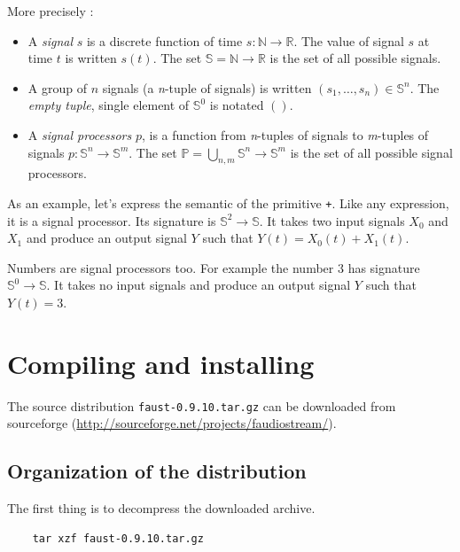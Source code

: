 \documentclass[a4paper]{book}
\begin{document}
More precisely :

\begin{itemize}

\item A \emph{signal} $s$ is a discrete function of time $s:\mathbb{N}\rightarrow\mathbb{R}$. 
The value of signal $s$ at time $t$ is written $s(t)$. 
The set $\mathbb{S}=\mathbb{N}\rightarrow\mathbb{R}$ is the set of all possible  signals.

\item A group of $n$ signals (a \emph{n}-tuple of signals) is written
$(s_{1},\ldots,s_{n})\in \mathbb{S}^{n}$.
The \emph{empty tuple}, single element of $\mathbb{S}^{0}$ is notated  $()$.

\item A \emph{signal processors} $p$, is a function from
\emph{n}-tuples of signals to \emph{m}-tuples of signals
$p:\mathbb{S}^{n}\rightarrow\mathbb{S}^{m}$. The set $\mathbb{P}=\bigcup_{n,m}\mathbb{S}^{n}\rightarrow\mathbb{S}^{m}$ is the
set of all possible signal processors.

\end{itemize}

As an example, let's express the semantic of the \faust primitive \lstinline'+'. Like any \faust expression, it is a signal processor. Its signature is $\mathbb{S}^{2}\rightarrow\mathbb{S}$. It takes two input signals $X_0$ and $X_1$ and produce an output signal $Y$ such that $Y(t) = X_0(t)+X_1(t)$. 

Numbers are signal processors too. For example the number $3$ has signature  $\mathbb{S}^{0}\rightarrow\mathbb{S}$.  It takes no input signals and produce an output signal $Y$ such that $Y(t) = 3$. 

\chapter{Compiling and installing \faust}

The \faust source distribution \lstinline'faust-0.9.10.tar.gz' can be downloaded from sourceforge (\url{http://sourceforge.net/projects/faudiostream/}).

\section{Organization of the distribution}
The first thing is to decompress the downloaded archive. 
\begin{lstlisting}
	tar xzf faust-0.9.10.tar.gz
\end{lstlisting}
\end{document}
